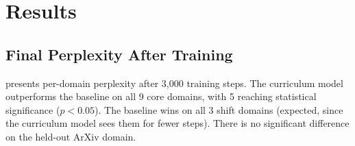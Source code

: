 \section{Results}
\label{sec:results}

\subsection{Final Perplexity After Training}
\label{sec:final_ppl}

 presents per-domain perplexity after 3{,}000 training steps. The curriculum model outperforms the baseline on all 9 core domains, with 5 reaching statistical significance ($p < 0.05$). The baseline wins on all 3 shift domains (expected, since the curriculum model sees them for fewer steps). There is no significant difference on the held-out ArXiv domain.

